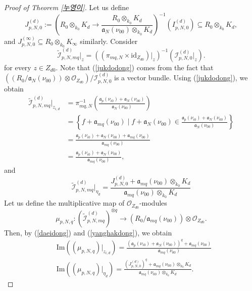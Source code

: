 \documentclass[a4paper,12pt]{amsart}
\theoremstyle{definition} %
\theoremstyle{remark}
\numberwithin{equation}{section}
\begin{document}
\begin{proof}[Proof of Theorem \ref{누영이}]
Let us define
$$ J^{(d)}_{p,N,0}:=\left(R_{0}\otimes_{k_0}K_d\to \frac{R_{0}\otimes_{k_0}K_d}{\mathfrak{a}_N(\nu_{00})\otimes_{k_0}K_d}\right)^{-1}\left(I^{(d)}_{p,N,0}\right)\subseteq R_{0}\otimes_{k_0}K_d,$$
and $J^{(\infty)}_{p,N,0}\subseteq R_{0}\otimes_{k_0}K_{\infty}$ similarly. Consider
\begin{equation}\label{jukdodong}
\tilde{\mathcal{I}}^{(d)}_{p,N,mq}|_z=((\pi_{mq,N}\times \mathrm{id}_{Z_{d0}})|_z)^{-1}\left(\mathcal{I}^{(d)}_{p,N,0}|_z\right).
\end{equation}
for every $z\in Z_{d0}$. Note that (\ref{jukdodong}) comes from the fact that $((R_0/\mathfrak{a}_N(\nu_{00}))\otimes \mathcal{O}_{Z_{d0}})/\mathcal{I}^{(d)}_{p,N,0}$ is a vector bundle. Using (\ref{jukdodong}), we obtain
\begin{equation}
\begin{aligned} \label{daeidong}
\tilde{\mathcal{I}}^{(d)}_{p,N,mq}|_{z_{i,d}}&=\pi^{-1}_{mq,N}\left(\frac{\mathfrak{a}_p(\nu_{i0})+\mathfrak{a}_N(\nu_{00})}{\mathfrak{a}_N(\nu_{00})}\right)
\\ &=\left\{f+\mathfrak{a}_{mq}(\nu_{00})\mid f+\mathfrak{a}_N(\nu_{00})\in \frac{\mathfrak{a}_p(\nu_{i0})+\mathfrak{a}_N(\nu_{00})}{\mathfrak{a}_N(\nu_{00})}\right\}
\\ &=\frac{\mathfrak{a}_p(\nu_{i0})+\mathfrak{a}_N(\nu_{00})+\mathfrak{a}_{mq}(\nu_{00})}{\mathfrak{a}_{mq}(\nu_{00})}
\\ &=\frac{\mathfrak{a}_p(\nu_{i0})+\mathfrak{a}_N(\nu_{00})}{\mathfrak{a}_{mq}(\nu_{00})},
\end{aligned}
\end{equation}
and
\begin{equation} \label{yanghakdong}
\tilde{\mathcal{I}}^{(d)}_{p,N,mq}|_{\eta_d}=\frac{J^{(d)}_{p,N,0}+\mathfrak{a}_{mq}(\nu_{00})\otimes_{k_0}K_d}{\mathfrak{a}_{mq}(\nu_{00})\otimes_{k_0}K_d}
\end{equation}
Let us define the multiplicative map of $\mathcal{O}_{Z_{d0}}$-modules
$$ \mu_{p,N,q}:(\tilde{\mathcal{I}}^{(d)}_{p,N,mq})^{\otimes q}\to (R_{0}/\mathfrak{a}_{mq}(\nu_{00}))\otimes \mathcal{O}_{Z_{d0}}.$$
Then, by (\ref{daeidong}) and (\ref{yanghakdong}), we obtain
\begin{equation} \label{seonggok-li}
\begin{aligned}
&\mathrm{Im}((\mu_{p,N,q})|_{z_{i,d}})=\frac{(\mathfrak{a}_{p}(\nu_{i0})+\mathfrak{a}_N(\nu_{00}))^q+\mathfrak{a}_{mq}(\nu_{00})}{\mathfrak{a}_{mq}(\nu_{00})}
\\ & \mathrm{Im}((\mu_{p,N,q})|_{\eta_d})=\frac{\left(J^{(d)}_{p,N,0}\right)^q+\mathfrak{a}_{mq}(\nu_{00})\otimes_{k_0}K_{d}}{\mathfrak{a}_{mq}(\nu_{00})\otimes_{k_0}K_{d}}.

\end{aligned}
\end{equation}
\end{proof}
\end{document}
